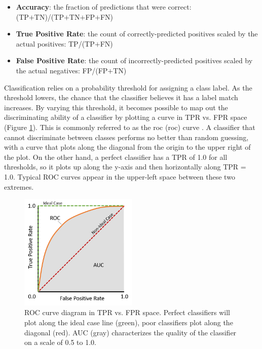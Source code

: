 \begin{itemize}[itemsep=2pt]
\item \textbf{Accuracy}: the fraction of predictions that were correct:\\ (TP$+$TN)/(TP$+$TN$+$FP$+$FN)\\
\item \textbf{True Positive Rate}: the count of correctly-predicted positives scaled by the actual positives: TP/(TP$+$FN)
\item \textbf{False Positive Rate}: the count of incorrectly-predicted positives scaled by the actual negatives: FP/(FP$+$TN)
\end{itemize}

Classification relies on a probability threshold for assigning a class label. As the threshold lowers, the chance that the classifier believes it has a label match increases. By varying this threshold, it becomes possible to map out the discriminating ability of a classifier by plotting a curve in TPR vs. FPR space (Figure \ref{fig:roc}). This is commonly referred to as the \acrlong{roc} (\acrshort{roc}) curve \citep{fawcett_introduction_2006}. A classifier that cannot discriminate between classes performs no better than random guessing, with a curve that plots along the diagonal from the origin to the upper right of the plot. On the other hand, a perfect classifier has a TPR of 1.0 for all thresholds, so it plots up along the y-axis and then horizontally along TPR = 1.0. Typical ROC curves appear in the upper-left space between these two extremes.

\begin{figure}[!htp]
\centering
\includegraphics[width=0.5\textwidth]{templates/images/Figure-ROC_AUC_Diagram.png}
\caption[Receiver Operating Characteristic diagram]{ROC curve diagram in TPR vs. FPR space. Perfect classifiers will plot along the ideal case line (green), poor classifiers plot along the diagonal (red). AUC (gray) characterizes the quality of the classifier on a scale of 0.5 to 1.0.}
\label{fig:roc}
\end{figure}

